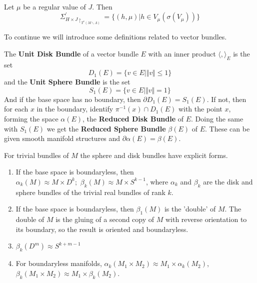 \begin{thm}

Let $\mu$ be a regular value of $J$. Then
\begin{equation}
    \Sigma^{\prime}_{H \times J \restriction_{T^*(M \backslash \Lambda)}}= \{ (h,\mu) \vert h \in V_{\mu}(\sigma(V_{\mu})) \}
\end{equation}
\end{thm}

To continue we will introduce some definitions related to vector bundles.

\begin{defn}

The \textbf{Unit Disk Bundle} of a vector bundle $E$ with an inner product $\langle, \rangle_{E}$ is the set
\begin{equation}
    D_1(E) = \{ v \in E \vert \Vert v \Vert \leq 1 \}
\end{equation}
and the \textbf{Unit Sphere Bundle} is the set
\begin{equation}
    S_1(E) = \{ v \in E \vert \Vert v \Vert = 1 \}
\end{equation}
And if the base space has no boundary, then $\partial D_1(E) = S_1(E)$. If not, then for each $x$  in the boundary, identify $\pi^{-1}(x) \cap D_1(E)$ with the point $x$, forming the space $\alpha(E)$, the \textbf{Reduced Disk Bundle} of $E$. Doing the same with $S_1(E)$ we get the \textbf{Reduced Sphere Bundle} $\beta(E)$ of $E$. These can be given smooth manifold structures and $\partial \alpha(E) = \beta(E)$.
\end{defn}

For trivial bundles of $M$ the sphere and disk bundles have explicit forms.
\begin{enumerate}
    \item If the base space is boundaryless, then $\alpha_k(M) \approx M \times D^k; \hspace{4pt} \beta_k(M) \approx M \times S^{k-1}$, where $\alpha_k$ and $\beta_k$ are the disk and sphere bundles of the trivial real bundles of rank $k$.
    \item If the base space is boundaryless, then $\beta_1(M)$ is the 'double' of $M$. The double of $M$ is the gluing of a second copy of $M$ with reverse orientation to its boundary, so the result is oriented and boundaryless.
    \item $\beta_k(D^m) \approx S^{k+m-1}$
    \item For boundaryless manifolds, $ \alpha_k(M_1 \times M_2) \approx M_1 \times \alpha_k(M_2)$, $\beta_k(M_1 \times M_2) \approx M_1 \times \beta_k(M_2)$.
\end{enumerate}

